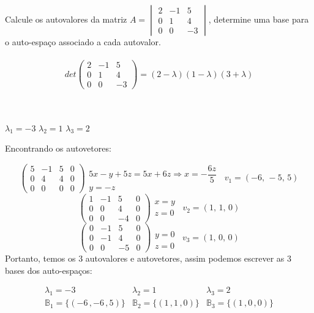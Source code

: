 \item Calcule os autovalores da matriz 
$A = 
\begin{vmatrix}
	2 & -1 &  5 \\
	0 &  1 &  4 \\
	0 &  0 & -3
\end{vmatrix}
$,
determine uma base para o auto-espaço
associado a cada autovalor.
\\ \\
\solucao
$$
det
\begin{pmatrix}
	2 & -1 &  5 \\
	0 &  1 &  4 \\
	0 &  0 & -3
\end{pmatrix}
= (2 - \lambda)(1 - \lambda)(3+\lambda)
$$
\\ \\
\begin{center}
	$\lambda_1 = -3$
	$\lambda_2 =  1$
	$\lambda_3 =  2$
\end{center}
Encontrando os autovetores:

$$
\begin{pmatrix}
	5 & -1 &  5 & 0\\
	0 &  4 &  4 & 0\\
	0 &  0 & 0 & 0
\end{pmatrix}
\begin{array}{cc}
	5x - y + 5z = 5x + 6z \Rightarrow x = -\dfrac{6z}{5} \\
	y = -z
\end{array}
\, \, \, 
v_1 = (-6, \, -5, \, 5)
$$
$$
\begin{pmatrix}
	1 & -1 &  5 & 0\\
	0 &  0 &  4 & 0\\
	0 &  0 & -4 & 0
\end{pmatrix}
\begin{array}{cc}
	x = y \\
	z = 0
\end{array}
\, \, \, 
v_2 = (1, \, 1, \, 0)
$$
$$
\begin{pmatrix}
	0 & -1 &  5 & 0\\
	0 & -1 &  4 & 0\\
	0 &  0 & -5 & 0
\end{pmatrix}
\begin{array}{cc}
	\\
	y = 0 \\
	z = 0
\end{array}
\, \, \, 
v_3 = (1, \, 0, \, 0)
$$
Portanto, temos os 3 autovalores e autovetores,
assim podemos escrever as 3 bases dos auto-espaços:

$$
\begin{array}{ccc}
	\lambda_1 = -3 & \lambda_2 = 1 &\lambda_3 = 2 \\
	\mathbb{B}_1 = \{(-6 \, , -6 \, , 5)\} &
	\mathbb{B}_2 = \{( 1 \, ,  1 \, , 0)\} &
	\mathbb{B}_3 = \{( 1 \, ,  0 \, , 0)\}
\end{array}
$$